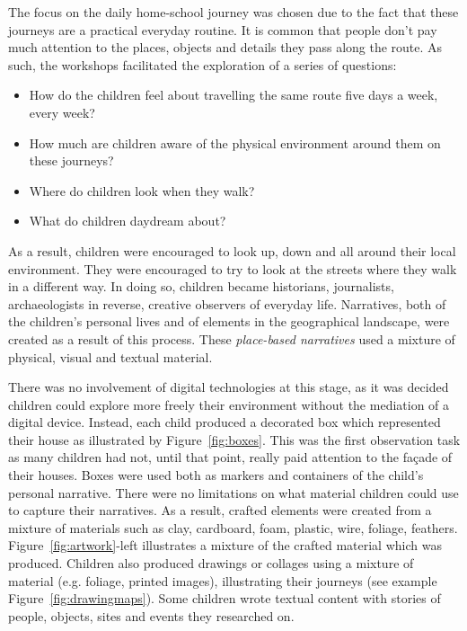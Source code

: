 \documentclass[acmlarge,screen,dvipsnames]{acmart}
\begin{document}
The focus on the daily home-school journey was chosen due to the fact that
these journeys are a practical everyday routine. It is common that people
don't pay much attention to the places, objects and details they pass along
the route. As such, the workshops facilitated the exploration of a series of
questions:

\begin{itemize} 
  \item How do the children feel about travelling the same route five days a week, every week?   
  \item How much are children aware of the physical environment around them on these journeys? 
  \item Where do children look when they walk? 
  \item What do children daydream about? 
\end{itemize}

As a result, children were encouraged to look up, down and all around their
local environment. They were encouraged to try to look at the streets where
they walk in a different way. In doing so, children became historians,
journalists, archaeologists in reverse, creative observers of everyday life.
Narratives, both of the children's personal lives and of elements in the
geographical landscape, were created as a result of this process. These
\emph{place-based narratives} used a mixture of physical, visual and textual
material. 

There was no involvement of digital technologies at this stage, as it was
decided children could explore more freely their environment without the
mediation of a digital device. Instead, each child produced a decorated box
which represented their house as illustrated by Figure~\ref{fig:boxes}. This
was the first observation task as many children had not, until that point,
really paid attention to the fa\c{c}ade of their houses. Boxes were used both
as markers and containers of the child's personal narrative. There were no
limitations on what material children could use to capture their narratives.
As a result, crafted elements were created from a mixture of materials such as
clay, cardboard, foam, plastic, wire, foliage, feathers.
Figure~\ref{fig:artwork}-left illustrates a mixture of the crafted material
which was produced. Children also produced drawings or collages using a
mixture of material (e.g. foliage, printed images), illustrating their
journeys (see example Figure~\ref{fig:drawingmaps}). Some children wrote
textual content with stories of people, objects, sites and events they
researched on. 
\end{document}
